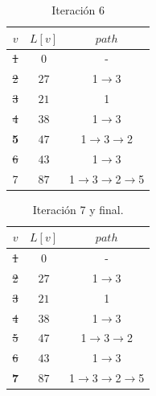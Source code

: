 \documentclass[letterpaper,10pt]{article}
\begin{document}
\begin{enumerate}
        \begin{minipage}[t]{0.3\textwidth}
            \begin{table}[H]
                \centering
            \begin{tabular}{|c|c|c|}\hline
                $ v  $ & $L[v]$ & $path$  \\ \hline
                 \sout{ 1 } & $0$ & -      \\\hline
                 \sout{ 2 } & $27$ & 1$\rightarrow$3   \\\hline
                 \sout{ 3 } & $21$ & 1   \\\hline
                 \sout{ 4 } & $38$ & 1$\rightarrow$3   \\\hline
                 \textbf{5} & $47$ & 1$\rightarrow$3$\rightarrow$2   \\\hline
                 \sout{ 6 } & $43$ & 1$\rightarrow$3   \\\hline
                 7 & $87$ & 1$\rightarrow$3$\rightarrow$2$\rightarrow$5   \\\hline
                \end{tabular}
                \caption{Iteración 6}
                \label{tablitaiteracion6}
            \end{table}
        \end{minipage}
        \begin{minipage}[t]{0.3\textwidth}
            \begin{table}[H]
                \centering
            \begin{tabular}{|c|c|c|}\hline
                $ v  $ & $L[v]$ & $path$  \\ \hline
                 \sout{ 1 } & $0$ & -      \\\hline
                 \sout{ 2 } & $27$ & 1$\rightarrow$3   \\\hline
                 \sout{ 3 } & $21$ & 1   \\\hline
                 \sout{ 4 } & $38$ & 1$\rightarrow$3   \\\hline
                 \sout{ 5 } & $47$ & 1$\rightarrow$3$\rightarrow$2   \\\hline
                 \sout{ 6 } & $43$ & 1$\rightarrow$3   \\\hline
                 \textbf{7} & $87$ & 1$\rightarrow$3$\rightarrow$2$\rightarrow$5   \\\hline
                \end{tabular}
                \caption{Iteración 7 y final.}
                \label{tablitaiteracion7}
            \end{table}
        \end{minipage}
        

\end{enumerate}
\end{document}
